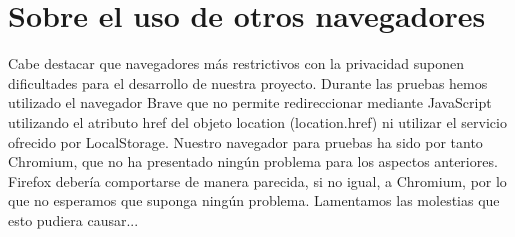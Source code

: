 \documentclass{article}[13pt]
\begin{document}
  \section{Sobre el uso de otros navegadores}
    Cabe destacar que navegadores más restrictivos con la privacidad suponen dificultades para el desarrollo de nuestra proyecto. Durante las pruebas hemos utilizado el navegador Brave que no permite redireccionar mediante JavaScript utilizando el atributo href del objeto location (location.href) ni utilizar el servicio ofrecido por LocalStorage. Nuestro navegador para pruebas ha sido por tanto Chromium, que no ha presentado ningún problema para los aspectos anteriores. Firefox debería comportarse de manera parecida, si no igual, a Chromium, por lo que no esperamos que suponga ningún problema. Lamentamos las molestias que esto pudiera causar...
\end{document}

